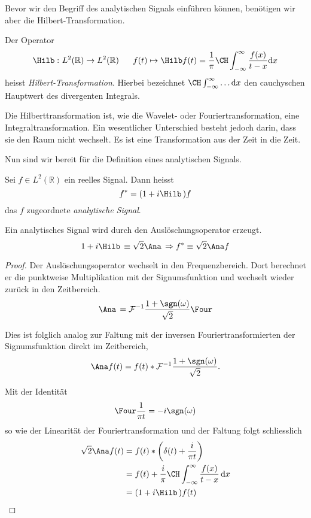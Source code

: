 Bevor wir den Begriff des analytischen Signals einführen können, benötigen wir aber die Hilbert-Transformation.
\begin{definition}
	Der Operator
 	\[
 	\Hilb\,\colon L^2(\mathbb R) \to L^2(\mathbb R)
 	~\quad~
 	f(t) \mapsto \Hilb f(t)
 	= \frac{1}{\pi} \CH\int_{-\infty}^{\infty}\frac{f(x)}{t-x} \mathrm{d}x
 	\]
 	heisst \emph{Hilbert-Transformation}.
 	Hierbei bezeichnet $\CH\int_{-\infty}^{\infty} \dots \mathrm{d}x$ den cauchyschen Hauptwert des divergenten Integrals.
\end{definition}

Die Hilberttransformation ist, wie die Wavelet- oder Fouriertransformation, eine Integraltransformation.
Ein wesentlicher Unterschied besteht jedoch darin, dass sie den Raum nicht wechselt.
Es ist eine Transformation aus der Zeit in die Zeit.

Nun sind wir bereit für die Definition eines analytischen Signals.
\begin{definition}
	\label{complex:analytic-signal}
	Sei $f \in L^2(\mathbb R)$ ein reelles Signal.
	Dann heisst
	\[f^\ast = (1 + i\Hilb\,)f \]
	das $f$ zugeordnete \emph{analytische Signal}.
\end{definition}
\begin{satz}
	Ein analytisches Signal wird durch den Auslöschungsoperator erzeugt.
	\[1 + i\Hilb\, \equiv \sqrt 2 \Ana\, \Rightarrow f^\ast \equiv \sqrt 2 \Ana f\]
\end{satz}

\begin{proof}
	Der Auslöschungsoperator wechselt in den Frequenzbereich.
	Dort berechnet er die punktweise Multiplikation mit der Signumsfunktion und wechselt wieder zurück in den Zeitbereich.
	\[\Ana\, = \mathcal{F}^{-1}\frac{1+\sgn(\omega)}{\sqrt 2}\Four\]
	
	Dies ist folglich analog zur Faltung mit der inversen Fouriertransformierten der Signumsfunktion direkt im Zeitbereich,
	\[ \Ana f(t) = f(t) * \mathcal{F}^{-1}\frac{1 + \sgn(\omega)}{\sqrt 2}. \]
	
	Mit der Identität
	\[\Four\frac{1}{\pi t} = -i\sgn(\omega)\]
	so wie der Linearität der Fouriertransformation und der Faltung folgt schliesslich
	\begin{align*}
		\sqrt 2 \Ana f(t) 
		&= f(t) * \biggl(\delta(t) + \frac{i}{\pi t} \biggr)\\
		&= f(t) + \frac{i}{\pi} \CH\int_{-\infty}^{\infty} \frac{f(x)}{t - x} \,\mathrm{d}x\\
		&= (1 + i\Hilb\,) f(t)\qedhere
	\end{align*}
\end{proof}

